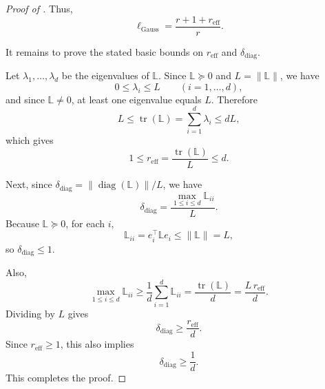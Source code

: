 \documentclass[10pt]{article}
\newcommand{\tr}{\operatorname{tr}}
\newcommand{\diag}{\operatorname{diag}}
\newcommand{\Lmat}{\mathbb{L}}
\begin{document}
\begin{proof}[Proof of ]
Thus,
\[
\ell_{\mathrm{Gauss}}
=
\frac{r+1+r_{\mathrm{eff}}}{r}.
\]

It remains to prove the stated basic bounds on \(r_{\mathrm{eff}}\) and
\(\delta_{\mathrm{diag}}\).

Let \(\lambda_1,\dots,\lambda_d\) be the eigenvalues of \(\Lmat\).
Since \(\Lmat\succeq 0\) and \(L=\|\Lmat\|\), we have
\[
0\le \lambda_i\le L
\qquad (i=1,\dots,d),
\]
and since \(\Lmat\neq 0\), at least one eigenvalue equals \(L\).
Therefore
\[
L \le \tr(\Lmat)=\sum_{i=1}^d \lambda_i \le dL,
\]
which gives
\[
1\le r_{\mathrm{eff}}=\frac{\tr(\Lmat)}{L}\le d.
\]

Next, since \(\delta_{\mathrm{diag}}=\|\diag(\Lmat)\|/L\), we have
\[
\delta_{\mathrm{diag}}
=
\frac{\max_{1\le i\le d} \Lmat_{ii}}{L}.
\]
Because \(\Lmat\succeq 0\), for each \(i\),
\[
\Lmat_{ii}=e_i^\top \Lmat e_i \le \|\Lmat\|=L,
\]
so \(\delta_{\mathrm{diag}}\le 1\).

Also,
\[
\max_{1\le i\le d}\Lmat_{ii}
\ge
\frac{1}{d}\sum_{i=1}^d \Lmat_{ii}
=
\frac{\tr(\Lmat)}{d}
=
\frac{L\,r_{\mathrm{eff}}}{d}.
\]
Dividing by \(L\) gives
\[
\delta_{\mathrm{diag}}\ge \frac{r_{\mathrm{eff}}}{d}.
\]
Since \(r_{\mathrm{eff}}\ge 1\), this also implies
\[
\delta_{\mathrm{diag}}\ge \frac1d.
\]
This completes the proof.
\end{proof}
\end{document}
